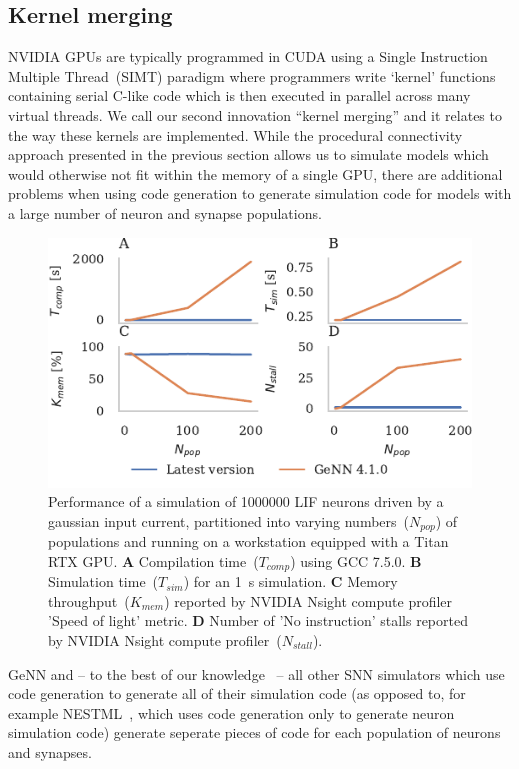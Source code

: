 \documentclass[9pt,twocolumn,twoside,lineno]{pnas-new}
\begin{document}
\subsection*{Kernel merging}
NVIDIA GPUs are typically programmed in CUDA using a Single Instruction Multiple Thread~(SIMT) paradigm where programmers write `kernel' functions containing serial C-like code which is then executed in parallel across many virtual threads.
We call our second innovation ``kernel merging'' and it relates to the way these kernels are implemented.
While the procedural connectivity approach presented in the previous section allows us to simulate models which would otherwise not fit within the memory of a single GPU, there are additional problems when using code generation to generate simulation code for models with a large number of neuron and synapse populations.
%
\begin{figure}
    \centering
    \includegraphics{figures/merging_scaling}
    \caption{Performance of a simulation of \num{1000000} LIF neurons driven by a gaussian input current, partitioned into varying numbers~($N_{pop}$) of populations and running on a workstation equipped with a Titan RTX GPU.
    \textbf{A} Compilation time~($T_{comp}$) using GCC 7.5.0.
    \textbf{B} Simulation time~($T_{sim}$) for an \SI{1}{\second} simulation.
    \textbf{C} Memory throughput~($K_{mem}$) reported by NVIDIA Nsight compute profiler 'Speed of light' metric.
    \textbf{D} Number of 'No instruction' stalls reported by NVIDIA Nsight compute profiler~($N_{stall}$).}
    \label{fig:merging_scaling}
\end{figure}
%
GeNN and -- to the best of our knowledge~\citep{Blundell2018} -- all other SNN simulators which use code generation to generate all of their simulation code (as opposed to, for example NESTML~\citep{Plotnikov2016}, which uses code generation only to generate neuron simulation code) generate seperate pieces of code for each population of neurons and synapses.
\end{document}
